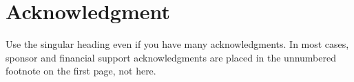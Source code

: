 \documentclass{IEEEtran}
\begin{document}
    \appendices
    
    \section*{Acknowledgment}
    
        Use the singular heading even if you have many acknowledgments. In most  cases, sponsor and financial support acknowledgments are placed in the  unnumbered footnote on the first page, not here.
    
    
    
    
        
    
        
\end{document}
